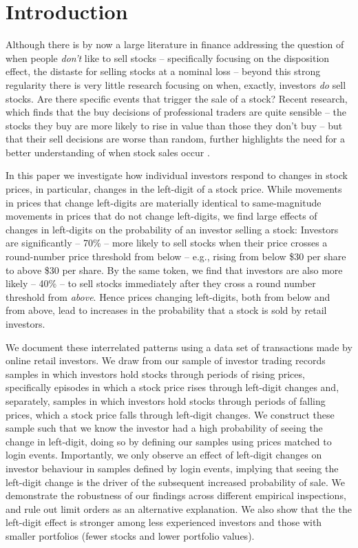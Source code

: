 \section{Introduction} \label{sec:introduction}

Although there is by now a large literature in finance addressing the question of when people \textit{don't} like to sell stocks -- specifically focusing on the disposition effect, the distaste for selling stocks at a nominal loss -- beyond this strong regularity there is very little research focusing on when, exactly, investors \textit{do} sell stocks. Are there specific events that trigger the sale of a stock? 
Recent research, which finds that the buy decisions of professional traders are quite sensible -- the stocks they buy are more likely to rise in value than those they don't buy -- but that their sell decisions are worse than random, further highlights the need for a better understanding of when stock sales occur \citep{akepanidtaworn2019selling}. 

In this paper we investigate how individual investors respond to changes in stock prices, in particular, changes in the left-digit of a stock price. While movements in prices that change left-digits are materially identical to same-magnitude movements in prices that do not change left-digits, we find large effects of changes in left-digits on the probability of an investor selling a stock:  Investors are significantly -- 70\% -- more likely to sell stocks when their price crosses a round-number price threshold from below -- e.g., rising from below \$30 per share to above \$30 per share. By the same token, we find that investors are also more likely -- 40\% -- to sell stocks immediately after they cross a round number threshold from \textit{above}. Hence prices changing left-digits, both from below and from above, lead to increases in the probability that a stock is sold by retail investors.  

We document these interrelated patterns using a data set of transactions made by online retail investors. We draw from our sample of investor trading records samples in which investors hold stocks through periods of rising prices, specifically episodes in which a stock price rises through left-digit changes and, separately, samples in which investors hold stocks through periods of falling prices, which a stock price falls through left-digit changes. We construct these sample such that we know the investor had a high probability of seeing the change in left-digit, doing so by defining our samples using prices matched to login events. Importantly, we only observe an effect of left-digit changes on investor behaviour in samples defined by login events, implying that seeing the left-digit change is the driver of the subsequent increased probability of sale. We demonstrate the robustness of our findings across different empirical inspections, and rule out limit orders as an alternative explanation. We also show that the the left-digit effect is stronger among less experienced investors and those with smaller portfolios (fewer stocks and lower portfolio values).  

